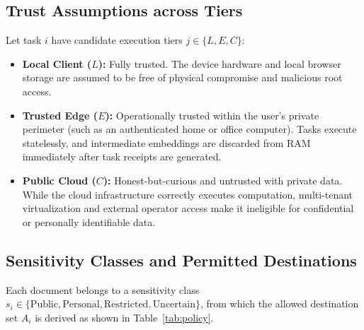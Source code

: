 \documentclass[conference]{IEEEtran}
\begin{document}
\subsection{Trust Assumptions across Tiers}
Let task $i$ have candidate execution tiers $j \in \{L,E,C\}$:
\begin{itemize}
  \item \textbf{Local Client ($L$):} Fully trusted. The device hardware and local browser storage are assumed to be free of physical compromise and malicious root access.
  \item \textbf{Trusted Edge ($E$):} Operationally trusted within the user's private perimeter (such as an authenticated home or office computer). Tasks execute statelessly, and intermediate embeddings are discarded from RAM immediately after task receipts are generated.
  \item \textbf{Public Cloud ($C$):} Honest-but-curious and untrusted with private data. While the cloud infrastructure correctly executes computation, multi-tenant virtualization and external operator access make it ineligible for confidential or personally identifiable data.
\end{itemize}

\subsection{Sensitivity Classes and Permitted Destinations}
Each document belongs to a sensitivity class $s_i \in \{\text{Public},\text{Personal},\text{Restricted},\text{Uncertain}\}$, from which the allowed destination set $A_i$ is derived as shown in Table~\ref{tab:policy}.

\begin{table}[t]
\caption{Privacy Policy Sensitivity Lattice and Feasible Destinations}
\label{tab:policy}
\centering
{}
\end{table}
\end{document}
